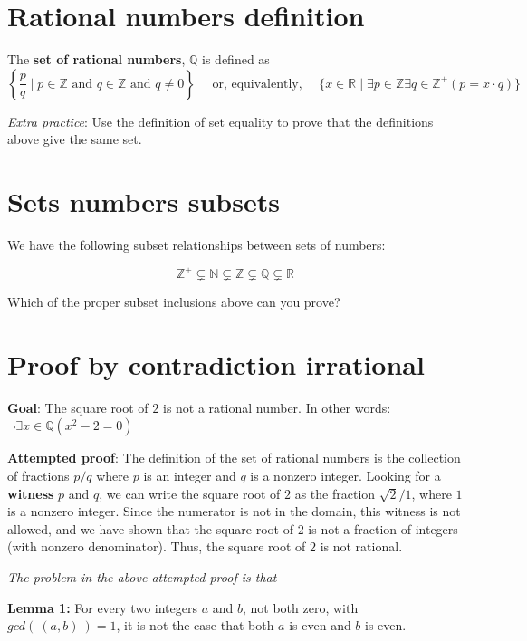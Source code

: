 \documentclass[12pt, oneside]{article}
\begin{document}
\section*{Rational numbers definition}


The {\bf set  of rational numbers}, $\mathbb{Q}$  is defined as 
\[
\left\{ \frac{p}{q} \mid p \in \mathbb{Z}  \text{ and  } q  \in \mathbb{Z} \text{ and } q \neq  0 \right\}
\text{~~~~or, equivalently,~~~~}
\{ x  \in  \mathbb{R} \mid \exists p \in \mathbb{Z}  \exists q \in \mathbb{Z}^+ ( p =  x \cdot q) \}
\]

{\it Extra practice}: Use the definition of set equality to prove that the definitions above  give the same set.

 \vfill
\section*{Sets numbers subsets}


We have the following subset relationships between sets of numbers:

\[
    \mathbb{Z}^{+} \subsetneq \mathbb{N} \subsetneq \mathbb{Z} \subsetneq \mathbb{Q} \subsetneq \mathbb{R}
\]


Which of the proper subset inclusions above can you prove?

\vspace{50pt} \vfill
\section*{Proof by contradiction irrational}


{\bf Goal}:  The square root of $2$ is not a rational number.  In other words: $\neg \exists x \in \mathbb{Q} ( x^2 -  2 = 0)$

{\bf Attempted proof}: The definition of the set of rational numbers is the collection of fractions $p/q$ where $p$ is an integer and $q$ is a nonzero integer. Looking for a {\bf witness} $p$ and $q$, we can write the square root of $2$ as the fraction 
$\sqrt{2 }/1$, where $1$ is a nonzero integer. Since the numerator is not in the domain, this witness is not allowed, and we have shown that the square root of $2$ is not a fraction of integers (with nonzero denominator). Thus, the square root of $2$ is not rational.


{\it The problem in the above attempted proof is that} \underline{\phantom{it only considers one candidate witness
and does not prove that no witnesses exist.}}


{\bf Lemma 1:} For every two integers $a$ and  $b$, not both zero, with  $gcd(~(a,b)~) = 1$, it is not the case that both $a$
is  even and $b$ is even.
\end{document}
